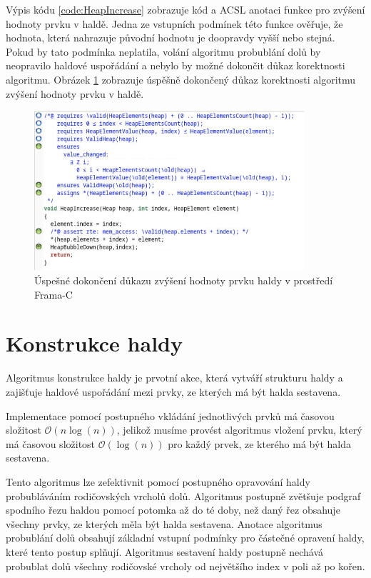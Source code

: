 Výpis kódu \ref{code:HeapIncrease} zobrazuje kód a ACSL anotaci funkce pro zvýšení hodnoty prvku v haldě. Jedna ze vstupních podmínek této funkce ověřuje, že hodnota, která nahrazuje původní hodnotu je doopravdy vyšší nebo stejná. Pokud by tato podmínka neplatila, volání algoritmu probublání dolů by neopravilo haldové uspořádání a nebylo by možné dokončit důkaz korektnosti algoritmu. Obrázek \ref{img:F-C-HeapIncrease} zobrazuje úspěšně dokončený důkaz korektnosti algoritmu zvýšení hodnoty prvku v haldě.

\begin{figure}[H]
	\centering
	\includegraphics[width=10cm]{images/frama-c-HeapIncrease}
	\caption{Úspešné dokončení důkazu zvýšení hodnoty prvku haldy v prostředí Frama-C}
	\label{img:F-C-HeapIncrease}
\end{figure}


\section{Konstrukce haldy}
\label{subsec:HeapBuild}

Algoritmus konstrukce haldy je prvotní akce, která vytváří strukturu haldy a zajišťuje haldové uspořádání mezi prvky, ze kterých má být halda sestavena.

Implementace pomocí postupného vkládání jednotlivých prvků má časovou složitost $\mathcal{O}(n\log(n))$, jelikož musíme provést algoritmus vložení prvku, který má časovou složitost $\mathcal{O}(\log(n))$ pro každý prvek, ze kterého má být halda sestavena.

Tento algoritmus lze zefektivnit pomocí postupného opravování haldy probubláváním rodičovských vrcholů dolů. Algoritmus postupně zvětšuje podgraf spodního řezu haldou pomocí potomka až do té doby, než daný řez obsahuje všechny prvky, ze kterých měla být halda sestavena. Anotace algoritmus probublání dolů obsahují základní vstupní podmínky pro částečné opravení haldy, které tento postup splňují. Algoritmus sestavení haldy postupně nechává probublat dolů všechny rodičovské vrcholy od největšího index v poli až po kořen.

